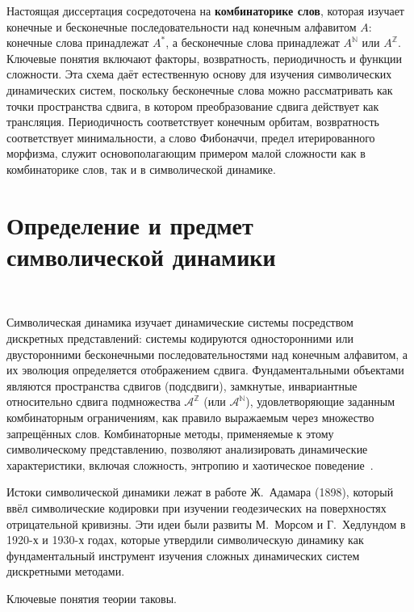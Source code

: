 \documentclass[a4paper,14pt]{extreport}
\theoremstyle{plain}
\theoremstyle{definition}
\theoremstyle{remark}
\begin{document}
Настоящая диссертация сосредоточена на \textbf{комбинаторике слов}, которая 
изучает конечные и бесконечные последовательности над конечным алфавитом $A$: 
конечные слова принадлежат $A^*$, а бесконечные слова принадлежат 
$A^{\mathbb{N}}$ или $A^{\mathbb{Z}}$. Ключевые понятия включают факторы, возвратность, периодичность и функции сложности. Эта схема даёт естественную основу для изучения символических динамических систем, поскольку бесконечные слова можно рассматривать как точки пространства сдвига, в котором преобразование сдвига действует как трансляция. Периодичность соответствует конечным орбитам, возвратность соответствует минимальности, а слово Фибоначчи, предел итерированного морфизма, служит основополагающим примером малой сложности как в комбинаторике слов, так и в символической динамике.
\section{Определение и предмет символической динамики}~\label{sec1.3}

Символическая динамика изучает динамические системы посредством дискретных 
представлений: системы кодируются односторонними или двусторонними бесконечными последовательностями над конечным алфавитом, а их эволюция определяется отображением сдвига. Фундаментальными объектами являются пространства сдвигов (подсдвиги), замкнутые, инвариантные относительно сдвига подмножества $\mathcal{A}^{\mathbb{Z}}$ (или $\mathcal{A}^{\mathbb{N}}$), удовлетворяющие заданным комбинаторным ограничениям, как правило выражаемым через множество запрещённых слов. Комбинаторные методы, применяемые к этому символическому представлению, позволяют анализировать динамические характеристики, включая сложность, энтропию и хаотическое поведение~\cite{Marcus}.

Истоки символической динамики лежат в работе 
Ж.~Адамара (1898), который ввёл символические кодировки при изучении геодезических на поверхностях отрицательной кривизны. Эти идеи были развиты М.~Морсом и Г.~Хедлундом в 1920-х и 1930-х годах, которые утвердили символическую динамику как фундаментальный инструмент изучения сложных динамических систем дискретными методами.

Ключевые понятия теории таковы.
\end{document}
